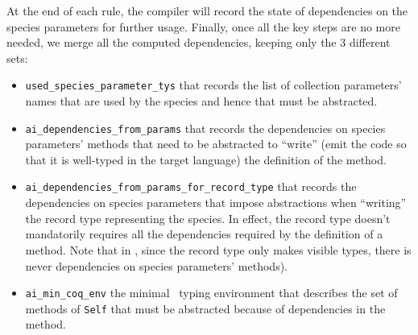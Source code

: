 At the end of each rule, the compiler will record the state of
dependencies on the species parameters for further usage. Finally,
once all the key steps are no more needed, we merge all the
computed dependencies, keeping only the 3 different sets:
\begin{itemize}
\item {\tt used\_species\_parameter\_tys} that records the list of
  collection parameters' names that are used by the species and hence
  that must be abstracted.
\item {\tt ai\_dependencies\_from\_params} that records the dependencies
  on species parameters' methods that need to be abstracted to
  ``write'' (emit the code so that it is well-typed in the target
  language) the definition of the method.
\item {\tt ai\_dependencies\_from\_params\_for\_record\_type} that
  records the dependencies on species parameters that impose
  abstractions when ``writing'' the record type representing the
  species. In effect, the record type doesn't mandatorily requires all
  the dependencies required by the definition of a method. Note that
  in \ocaml, since the record type only makes visible types, there is
  never dependencies on species parameters' methods).
\item {\tt ai\_min\_coq\_env} the minimal \coq\ typing environment that
  describes the set of methods of {\tt Self} that must be abstracted
  because of dependencies in the method.
\end{itemize}
